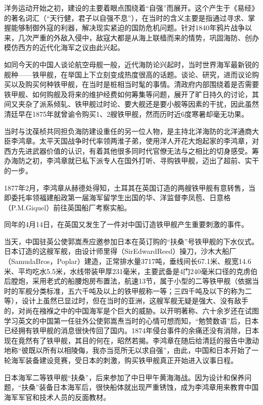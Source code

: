 \documentclass[12pt,UTF8]{ctexbook}
\begin{document}
洋务运动开始之初，建设的主要着眼点围绕着“自强”而展开。这个产生于《易经》的著名词汇（“天行健，君子以自强不息”），在当时的含义主要是指通过寻求、掌握能够制御外寇的利器，解决现实紧迫的国防危机问题。针对1840年鸦片战争以来，几次严重的外敌入侵中，敌寇大都是从海上联樯而来的情势，巩固海防、创办模仿西方的近代化海军之议由此兴起。

如同今天的中国人谈论航空母舰一般，近代海防论兴起时，当时世界海军最新锐的舰种——铁甲舰，在举国上下立刻变成热度很高的话题。谈论、研究，进而议论购买以及购买何种铁甲舰，在当时是桩相当时髦的事情。清政府内部围绕着是否需要铁甲舰、如何购舰及将来的维护经费如何筹集等问题，展开了旷日持久的讨论，其间又夹杂了派系倾轧、铁甲舰过时论、要大舰还是要小舰等因素的干扰，因此虽然清廷早在1875年就曾谕令购买1、2艘铁甲舰，然而历时近6度寒暑却毫无功果。

当时与沈葆桢共同担负海防建设重任的另一位人物，是主持北洋海防的北洋通商大臣李鸿章。太平天国战争时代率领两淮子弟，使用洋人开花大炮起家的李鸿章，对西方先进武器价值的认识，有着其他很多同时代官僚无法与之相比的切身感受。筹办海防之初，李鸿章就已私下派专人在国外打听、寻购铁甲舰，迈出了超前、实干的一步。

1877年2月，李鸿章从赫德处得知，土耳其在英国订造的两艘铁甲舰有意转售，当即委托率领福建船政第一届海军留学生出国的华、洋监督李凤苞、日意格（P.M.Giquel）前往英国船厂考察实船。

同年的4月14日，在英国又发生了一件对中国订造铁甲舰产生重要刺激的事件。

当天，中国驻英公使郭嵩焘应邀参加日本在英订购的“扶桑”号铁甲舰的下水仪式。日本订造的这艘军舰，由设计师里得（SirEdwardReed）操刀，沙木大船厂（SamudaBros，Poplar）建造，正常排水量3717吨，垂线间长67.1米、舰宽14.6米、平均吃水5.5米，水线带装甲厚231毫米，主要武备是4门240毫米口径的克虏伯后膛炮，采用老式的船腰炮房布置法，航速13节，属于小型的二等铁甲舰（依据当时的军舰分类标准，五六千吨及以上的铁甲舰称一等；三四千吨及以下的称为二等），设计上虽然已显过时，但在当时的亚洲，这艘军舰无疑是强大、没有敌手的，对尚在襁褓之中的中国海军是个巨大的威胁。以开明著称、六十余岁还在试图学习英文的中国第一任驻外公使郭嵩焘当时的心情可想而知，“勉赞数语”后，日本已经拥有铁甲舰的消息很快传回了国内。1874年侵台事件的余痛还没有消除，日本现在竟然有了铁甲舰，其目的何在，昭然若揭。李鸿章在随后给清廷的报告中激动地称“彼既以所有以相陵侮，我亦当觅所无以求自强”，由此，中国和日本开始了一轮海军装备建设竞赛，受日本的刺激，购买铁甲舰真正开始进入议事日程。

日本海军二等铁甲舰“扶桑”，后来参加了中日甲午黄海海战。因为设计和保养问题，“扶桑”装备日本海军后，很快船体就出现严重锈蚀，成为李鸿章用来教育中国海军军官和技术人员的反面教材。
\end{document}
